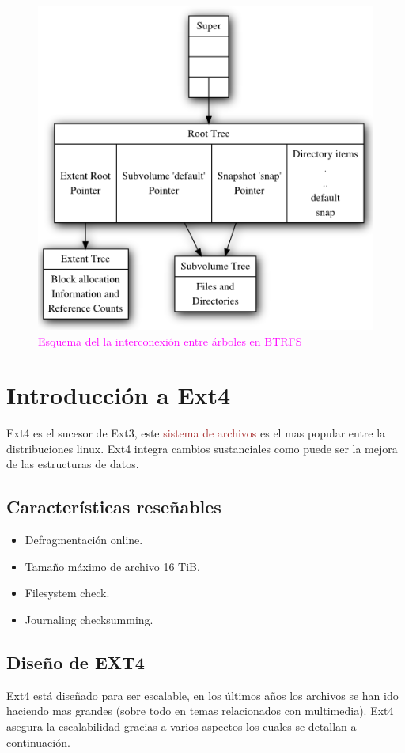 \begin{figure}[H]
    \centering
    \includegraphics[scale=0.6]{doc/assets/images/btrfs/Design-roots.png}
    \caption{\textcolor{magenta}{ Esquema del la interconexión entre árboles en BTRFS \cite{btrees}}}
    \label{fig:my_label}
\end{figure}


\section{Introducción a Ext4}
Ext4 es el sucesor de Ext3, este \textcolor{brown}{sistema de archivos} es el mas popular entre la distribuciones linux. Ext4 integra cambios sustanciales como puede ser la mejora de las estructuras de datos.

\subsection{Características reseñables}
\begin{itemize}
    \item Defragmentación online.
    \item Tamaño máximo de archivo 16 TiB.
    \item Filesystem check.
    \item Journaling checksumming.
\end{itemize}


\subsection{Diseño de EXT4}
Ext4 está diseñado para ser escalable, en los últimos años los archivos se han ido haciendo mas grandes (sobre todo en temas relacionados con multimedia). Ext4 asegura la escalabilidad gracias a varios aspectos los cuales se detallan a continuación.\\


